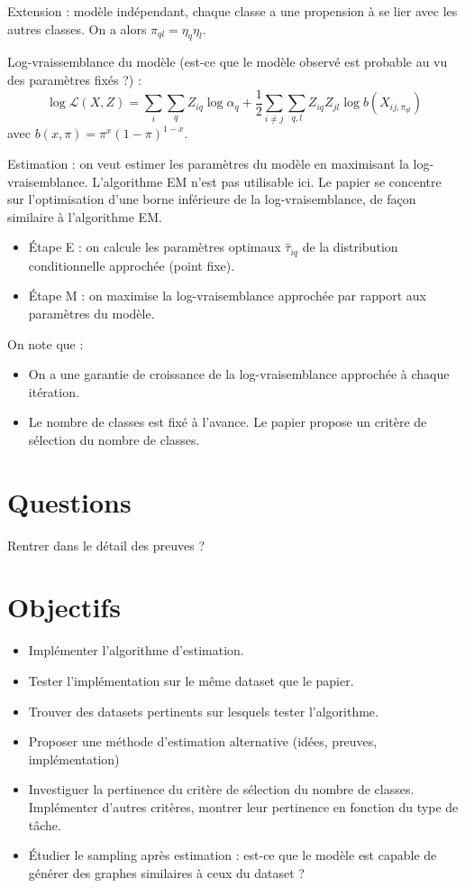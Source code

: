 \documentclass[12pt]{article}
\begin{document}
\vspace{5mm}

Extension : modèle indépendant, chaque classe a une propension à se lier avec les autres classes. On a alors $\pi_{ql}=\eta_q\eta_l$.

Log-vraissemblance du modèle (est-ce que le modèle observé est probable au vu des paramètres fixés ?) :
$$\log \mathcal{L}(X, Z) = \sum_i\sum_qZ_{iq}\log \alpha_q + \frac{1}{2} \sum_{i\neq j}\sum_{q,l}Z_{iq}Z_{jl}\log b(X_{ij,\pi_{ql}})$$
avec $b(x,\pi)=\pi^x(1-\pi)^{1-x}$.

Estimation : on veut estimer les paramètres du modèle en maximisant la log-vraisemblance. L'algorithme EM n'est pas utilisable ici. Le papier se concentre sur l'optimisation d'une borne inférieure de la log-vraisemblance, de façon similaire à l'algorithme EM.

\begin{itemize}
    \item Étape E : on calcule les paramètres optimaux $\hat{\tau}_{iq}$ de la distribution conditionnelle approchée (point fixe).
    \item Étape M : on maximise la log-vraisemblance approchée par rapport aux paramètres du modèle.
\end{itemize}
On note que :
\begin{itemize}
    \item On a une garantie de croissance de la log-vraisemblance approchée à chaque itération.
    \item Le nombre de classes est fixé à l'avance. Le papier propose un critère de sélection du nombre de classes.
\end{itemize}


\section{Questions}

Rentrer dans le détail des preuves ?

\section{Objectifs}

\begin{itemize}
    \item Implémenter l'algorithme d'estimation.
    \item Tester l'implémentation sur le même dataset que le papier.
    \item Trouver des datasets pertinents sur lesquels tester l'algorithme.
    \item Proposer une méthode d'estimation alternative (idées, preuves, implémentation)
    \item Investiguer la pertinence du critère de sélection du nombre de classes. Implémenter d'autres critères, montrer leur pertinence en fonction du type de tâche.
    \item Étudier le sampling après estimation : est-ce que le modèle est capable de générer des graphes similaires à ceux du dataset ?
\end{itemize}
\end{document}
